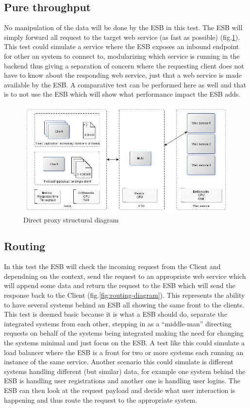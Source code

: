 \subsection{Pure throughput}
No manipulation of the data will be done by the ESB in this test. The ESB will simply forward all request to the target web service (as fast as possible) (fig.\ref{fig:proxy-diagram}). 
This test could simulate a service where the ESB exposes an inbound endpoint for other an system to connect to, modularizing which service is running in the backend thus giving a separation of concern where the requesting client does not have to know about the responding web service, just that a web service is made available by the ESB.
A comparative test can be performed here as well and that is to not use the ESB which will show what performance impact the ESB adds. 

\begin{figure}[H]
	\centerline{\includegraphics[scale=0.43]{img/direct_proxy}}
	\caption{Direct proxy structural diagram}
	\label{fig:proxy-diagram}
\end{figure}

\subsection{Routing}
In this test the ESB will check the incoming request from the Client and dependning on the context, send the request to an appropriate web service which will append some data and return the request to the ESB which will send the response back to the Client (fig.\ref{fig:routing-diagram}).
This represents the ability to have several systems behind an ESB all showing the same front to the clients.
This test is deemed basic because it is what a ESB should do, separate the integrated systems from each other, stepping in as a ``middle-man'' directing requests on behalf of the systems being integrated making the need for changing the systems minimal and just focus on the ESB. 
A test like this could simulate a load balancer where the ESB is a front for two or more systems each running an instance of the same service. Another scenario this could simulate is different systems handling different (but similar) data, for example one system behind the ESB is handling user registrations and another one is handling user logins. The ESB can then look at the request payload and decide what user interaction is happening and thus route the request to the appropriate system.

